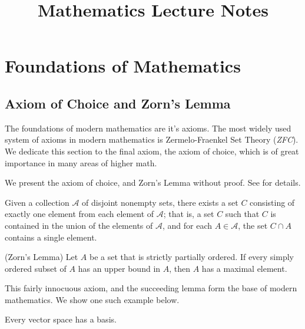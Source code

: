\documentclass[a4paper]{report}
\title{Mathematics Lecture Notes}
\begin{document}
  
\maketitle
\tableofcontents

\chapter{Foundations of Mathematics}

\section{Axiom of Choice and Zorn's Lemma}

The foundations of modern mathematics are it's axioms. The most widely used system of axioms in modern mathematics is Zermelo-Fraenkel Set Theory (\textit{ZFC}). We dedicate this section to the final axiom, the axiom of choice, which is of great importance in many areas of higher math.

We present the axiom of choice, and Zorn's Lemma without proof. See \cite{munkrestopology} for details.

\begin{definition}
  Given a collection $\mathcal{A}$ of disjoint nonempty sets, there exists a set $C$ consisting of exactly one element from each element of $\mathcal{A}$; that is, a set $C$ such that $C$ is contained in the union of the elements of $\mathcal{A}$, and for each $A \in \mathcal{A}$, the set $C\cap A$ contains a single element.
\end{definition}

\begin{lemma} (Zorn's Lemma)
  Let $A$ be a set that is strictly partially ordered. If every simply ordered subset of $A$ has an upper bound in $A$, then $A$ has a maximal element.
\end{lemma}

This fairly innocuous axiom, and the succeeding lemma form the base of modern mathematics. We show one such example below.

\begin{theorem}
  Every vector space has a basis.
\end{theorem}
\end{document}
